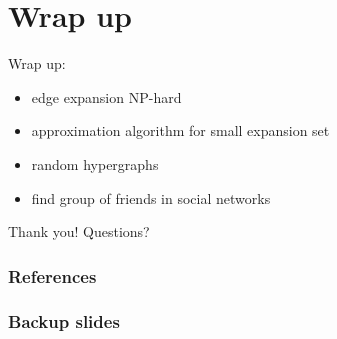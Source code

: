 \documentclass{beamer}
\begin{document}
		
	\section{Wrap up}
	\begin{frame}
		Wrap up:
		
		\begin{itemize}
		
			\item edge expansion NP-hard
			\item approximation algorithm for small expansion set
			\item random hypergraphs
			\item find group of friends in social networks
			
		\end{itemize}
	\end{frame}
	
	\begin{frame}
			Thank you! 
			Questions?
	\end{frame}


%
\begin{frame}[allowframebreaks]
	\frametitle{References}
\printbibliography{}
\end{frame}


		\begin{frame}
		\frametitle{Backup slides}
		\end{frame}
		
\end{document}
